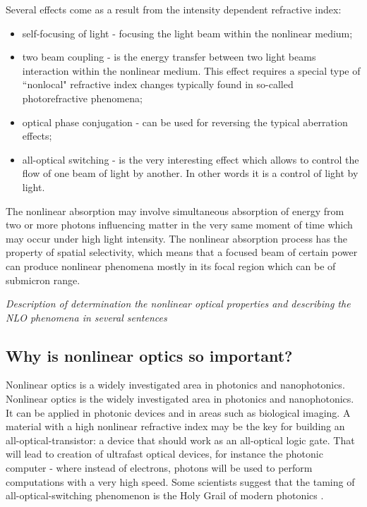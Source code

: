 \documentclass[12pt,twoside,a4paper]{article}
\numberwithin{equation}{subsection}
\numberwithin{figure}{subsection}
\begin{document}
Several effects come as a result from the intensity dependent refractive index:
\begin{itemize}  
  \item self-focusing of light - focusing the light beam within the nonlinear medium;
  \item two beam coupling - is the energy transfer between two light beams interaction within the nonlinear medium. This effect
  requires a special type of ``nonlocal" refractive index changes typically found in so-called photorefractive phenomena;
  \item optical phase conjugation - can be used for reversing the typical aberration effects;
  \item all-optical switching - is the very interesting effect which allows to control the flow of one beam of light by another. In
  other words it is a control of light by light.
\end{itemize}

The nonlinear absorption may involve simultaneous absorption of energy from two or more photons influencing matter in the very 
same moment of time which may occur under high light intensity. The nonlinear absorption process has the property of spatial
selectivity, which means that a focused beam of certain power can produce nonlinear phenomena mostly in its focal region which can
be of submicron range.

\textit{Description of determination the nonlinear optical properties and describing the NLO phenomena in several sentences}

\subsection{Why is nonlinear optics so important?} \label{chap:introducion_rank}

Nonlinear optics is a widely investigated area in photonics and nanophotonics. Nonlinear optics is the widely investigated area
in photonics and nanophotonics. It can be applied in photonic devices and in areas such as biological imaging. A material
with a high nonlinear refractive index may be the key for building an all-optical-transistor: a device that should work as an
all-optical logic gate. That will lead to creation of ultrafast optical devices, for instance the photonic computer - where
instead of electrons, photons will be used to perform computations with a very high speed. Some scientists suggest that the taming
of all-optical-switching phenomenon is the Holy Grail of modern photonics \cite{samoc_nlo_opt_mat}.
\end{document}
